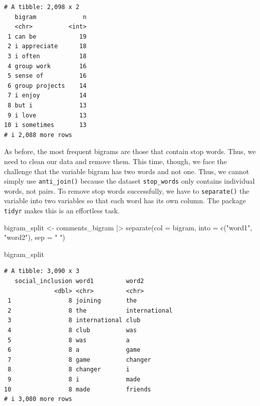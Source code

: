 \documentclass[
  letterpaper,
]{krantz}
\makeatletter
\newenvironment{Shaded}{\begin{snugshade}}{\end{snugshade}}
\newcommand{\AttributeTok}[1]{\textcolor[rgb]{0.40,0.45,0.13}{#1}}
\newcommand{\FunctionTok}[1]{\textcolor[rgb]{0.28,0.35,0.67}{#1}}
\newcommand{\NormalTok}[1]{\textcolor[rgb]{0.00,0.23,0.31}{#1}}
\newcommand{\OtherTok}[1]{\textcolor[rgb]{0.00,0.23,0.31}{#1}}
\newcommand{\SpecialCharTok}[1]{\textcolor[rgb]{0.37,0.37,0.37}{#1}}
\newcommand{\StringTok}[1]{\textcolor[rgb]{0.13,0.47,0.30}{#1}}
\newenvironment{kframe}{%
\medskip{}
\setlength{\fboxsep}{.8em}
 \def\at@end@of@kframe{}%
 \ifinner\ifhmode%
  \def\at@end@of@kframe{\end{minipage}}%
  \begin{minipage}{\columnwidth}%
 \fi\fi%
 \def\FrameCommand##1{\hskip\@totalleftmargin \hskip-\fboxsep
 \colorbox{shadecolor}{##1}\hskip-\fboxsep
     \hskip-\linewidth \hskip-\@totalleftmargin \hskip\columnwidth}%
 \MakeFramed {\advance\hsize-\width
   \@totalleftmargin\z@ \linewidth\hsize
   \@setminipage}}%
 {\par\unskip\endMakeFramed%
 \at@end@of@kframe}
\renewenvironment{Shaded}{\begin{kframe}}{\end{kframe}}
\makeatother
\begin{document}
\begin{verbatim}
# A tibble: 2,098 x 2
   bigram             n
   <chr>          <int>
 1 can be            19
 2 i appreciate      18
 3 i often           18
 4 group work        16
 5 sense of          16
 6 group projects    14
 7 i enjoy           14
 8 but i             13
 9 i love            13
10 i sometimes       13
# i 2,088 more rows
\end{verbatim}

As before, the most frequent bigrams are those that contain stop words.
Thus, we need to clean our data and remove them. This time, though, we
face the challenge that the variable bigram has two words and not one.
Thus, we cannot simply use \texttt{anti\_join()} because the dataset
\texttt{stop\_words} only contains individual words, not pairs. To
remove stop words successfully, we have to \texttt{separate()} the
variable into two variables so that each word has its own column. The
package \texttt{tidyr} makes this is an effortless task.

\begin{Shaded}
\begin{Highlighting}[]
\NormalTok{bigram\_split }\OtherTok{\textless{}{-}}
\NormalTok{  comments\_bigram }\SpecialCharTok{|\textgreater{}}
  \FunctionTok{separate}\NormalTok{(}\AttributeTok{col =}\NormalTok{ bigram,}
           \AttributeTok{into =} \FunctionTok{c}\NormalTok{(}\StringTok{"word1"}\NormalTok{, }\StringTok{"word2"}\NormalTok{),}
           \AttributeTok{sep =} \StringTok{" "}\NormalTok{)}

\NormalTok{bigram\_split}
\end{Highlighting}
\end{Shaded}

\begin{verbatim}
# A tibble: 3,090 x 3
   social_inclusion word1         word2        
              <dbl> <chr>         <chr>        
 1                8 joining       the          
 2                8 the           international
 3                8 international club         
 4                8 club          was          
 5                8 was           a            
 6                8 a             game         
 7                8 game          changer      
 8                8 changer       i            
 9                8 i             made         
10                8 made          friends      
# i 3,080 more rows
\end{verbatim}
\end{document}

